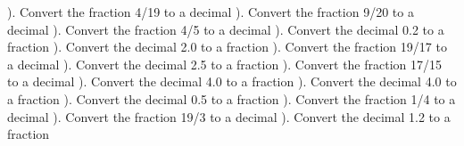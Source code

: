 \documentclass{article}%
\begin{document}
). Convert the fraction 4/19 to a decimal%
\newline%
\newline%
). Convert the fraction 9/20 to a decimal%
\newline%
\newline%
). Convert the fraction 4/5 to a decimal%
\newline%
\newline%
). Convert the decimal 0.2 to a fraction%
\newline%
\newline%
). Convert the decimal 2.0 to a fraction%
\newline%
\newline%
). Convert the fraction 19/17 to a decimal%
\newline%
\newline%
). Convert the decimal 2.5 to a fraction%
\newline%
\newline%
). Convert the fraction 17/15 to a decimal%
\newline%
\newline%
). Convert the decimal 4.0 to a fraction%
\newline%
\newline%
). Convert the decimal 4.0 to a fraction%
\newline%
\newline%
). Convert the decimal 0.5 to a fraction%
\newline%
\newline%
). Convert the fraction 1/4 to a decimal%
\newline%
\newline%
). Convert the fraction 19/3 to a decimal%
\newline%
\newline%
). Convert the decimal 1.2 to a fraction%
\end{document}
